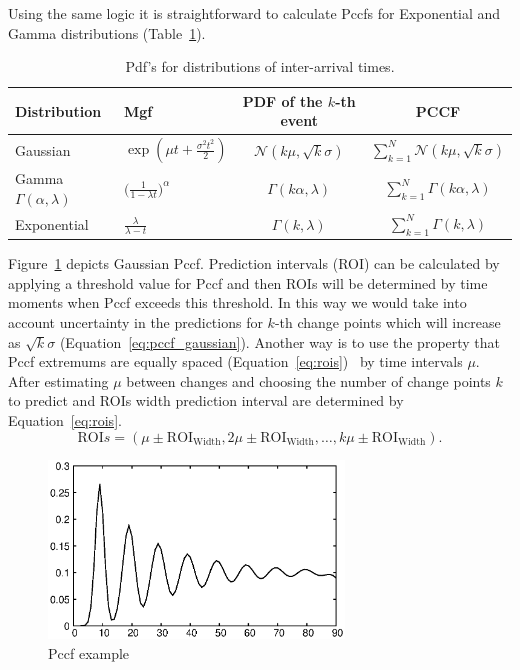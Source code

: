 Using the same logic it is straightforward to calculate Pccfs for Exponential and Gamma distributions (Table~\ref{table:pccfs}).
\begin{table}[!htb] \caption{Pdf's for distributions of inter-arrival times.}\label{table:pccfs}
	\begin{center}
		\begin{tabular}{|l|l|c|c|}
			\hline
			Distribution & Mgf & PDF of the $k$-th event & PCCF  \\[5pt]
			\hline
			Gaussian & $\exp{ (\mu t + \frac{\sigma^2 t^2}{2}) }$ & $\mathcal{N}(k \mu, \sqrt{k} \sigma)$ & $\sum_{k=1}^N \mathcal{N}(k \mu, \sqrt{k} \sigma)$ \\
			Gamma $\Gamma(\alpha, \lambda)$ & $\Big ( \frac{1}{1- \lambda t} \Big )^{\alpha}$ & $\Gamma(k \alpha, \lambda)$ & $\sum_{k=1}^N \Gamma(k \alpha, \lambda)$\\
			Exponential & $\frac{\lambda}{\lambda - t}$ & $\Gamma(k, \lambda)$ & $\sum_{k=1}^N \Gamma(k, \lambda)$\\
			\hline
		\end{tabular}
	\end{center}
\end{table}
Figure~\ref{fig:pccf_example} depicts Gaussian Pccf.
Prediction intervals (ROI) can be calculated by applying a threshold value for Pccf and then ROIs will be determined by time moments when Pccf exceeds this threshold.
In this way we would take into account uncertainty in the predictions for $k$-th change points which will increase as $\sqrt{k} \sigma$ (Equation~\ref{eq:pccf_gaussian}).
Another way is to use the property that Pccf extremums are equally spaced (Equation~\ref{eq:rois})~\cite{MaslovSDM2016} by time intervals $\mu$.
After estimating $\mu$ between changes and choosing the number of change points $k$ to predict and ROIs width prediction interval are determined by Equation~\ref{eq:rois}.
\begin{equation}\label{eq:rois}
	\text{ROI}s = (\mu \pm \text{ROI}_{\text{Width}}, 2 \mu \pm \text{ROI}_{\text{Width}}, \dots , k \mu \pm \text{ROI}_{\text{Width}}).
\end{equation}
\begin{figure}[!htb]
	\centering
	\includegraphics[width=0.7\textwidth]{images/example_pccf.eps}
	\caption{Pccf example}\label{fig:pccf_example}
\end{figure}

